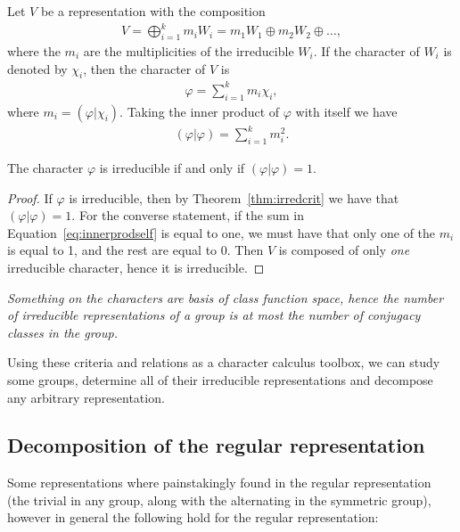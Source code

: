 \begin{note}
	Let $V$ be a representation with the composition 
	\begin{align*}
		V = \bigoplus_{i=1}^k m_i W_i = m_1W_1 \oplus m_2W_2 \oplus \dots,
	\end{align*}
	where the $m_i$ are the multiplicities of the irreducible $W_i$. If the character of $W_i$ is denoted by $\chi_i$, then the character of $V$ is
	\begin{align*}
		\varphi = \sum_{i=1}^k m_i \chi_i,
	\end{align*}
	where $m_i = (\varphi|\chi_i)$.	Taking the inner product of $\varphi$ with itself we have
	\begin{align}\label{eq:innerprodself}
		(\varphi|\varphi) = \sum_{i=1}^k m_i^2.
	\end{align}
\end{note}

\begin{theorem}
	The character $\varphi$ is irreducible if and only if $(\varphi|\varphi) = 1$.
\end{theorem}
\begin{proof}
	If $\varphi$ is irreducible, then by Theorem~\ref{thm:irredcrit} we have that $(\varphi|\varphi) = 1$. For the converse statement, if the sum in Equation~\ref{eq:innerprodself} is equal to one, we must have that only one of the $m_i$ is equal to 1, and the rest are equal to 0. Then $V$ is composed of only \textit{one} irreducible character, hence it is irreducible.
\end{proof}

\textit{Something on the characters are basis of class function space, hence the number of irreducible representations of a group is at most the number of conjugacy classes in the group.}

Using these criteria and relations as a character calculus toolbox, we can study some groups, determine all of their irreducible representations and decompose any arbitrary representation.

\subsection{Decomposition of the regular representation}

Some representations where painstakingly found in the regular representation (the trivial in any group, along with the alternating in the symmetric group), however in general the following hold for the regular representation:

